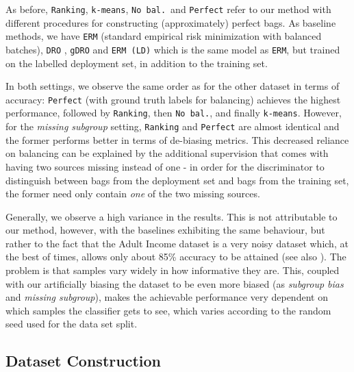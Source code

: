 As before, \texttt{Ranking}, \texttt{k-means}, \texttt{No bal.}\ and \texttt{Perfect} refer to our method with different procedures for constructing (approximately) perfect bags.
As baseline methods, we have \texttt{ERM} (standard empirical risk minimization with balanced batches), \texttt{DRO} \citep{HasSriNamLia18}, \texttt{gDRO} \citep{sagawa2019distributionally}
and \texttt{ERM (LD)} which is the same model as \texttt{ERM}, but trained on the labelled deployment set, in addition to the training set.

In both settings, we observe the same order as for the other dataset in terms of accuracy: \texttt{Perfect} (with ground truth labels for balancing) achieves the highest performance, followed by \texttt{Ranking}, then \texttt{No bal.}, and finally \texttt{k-means}.
However, for the \emph{missing subgroup} setting, \texttt{Ranking} and \texttt{Perfect} are almost identical and the former performs better in terms of de-biasing metrics.
This decreased reliance on balancing can be explained by the additional supervision that comes with having two sources missing instead of one - in order for the discriminator to distinguish between bags from the deployment set and bags from the training set, the former need only contain \emph{one} of the two missing sources.

Generally, we observe a high variance in the results. This is not attributable to our method, however, with the baselines exhibiting the same behaviour, but rather to the fact that the Adult Income dataset is a very noisy dataset which, at the best of times, allows only about 85\% accuracy to be attained (see also \cite{agrawal2020debiasing}). The problem is that samples vary widely in how informative they are. This, coupled with our artificially biasing the dataset to be even more biased (as \emph{subgroup bias} and \emph{missing subgroup}), makes the achievable performance very dependent on which samples the classifier gets to see, which varies according to the random seed used for the data set split.

\subsection{Dataset Construction}\label{sec:dataset-construction}


